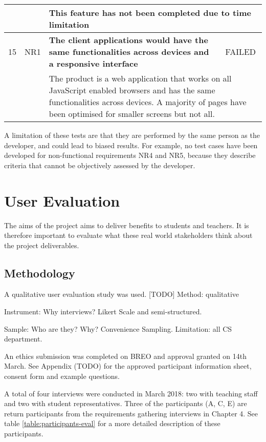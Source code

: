 \begin{table}[!ht]
\begin{tabularx}{\textwidth}{|c|c|X|c|}
        \hline
        &                         & \multicolumn{2}{X|}{This feature has not been completed due to time limitation}                                                                                                 \\
		\hline
		15 & NR1 & \textbf{The client applications would have the same functionalities
        across devices and a responsive interface} & \cellcolor{pink}FAILED \\
		\hline
           &      & \multicolumn{2}{X|}{The product is a web application that works on all 
           JavaScript enabled browsers and has the same functionalities across devices.
           A majority of pages have been optimised for smaller screens but not all.}      \\
        \hline
	\end{tabularx}
\end{table}

A limitation of these tests are that they are performed by the same person as the developer, 
and could lead to biased results. 
For example, no test cases have been developed for non-functional requirements NR4 and NR5, 
because they describe criteria that cannot be objectively assessed by the developer.

\section{User Evaluation}

The aims of the project aims to deliver benefits to students and teachers. 
It is therefore important to evaluate what these real world stakeholders think about the project deliverables.

\subsection{Methodology}

A qualitative user evaluation study was used.
[TODO]
Method: qualitative

Instrument: Why interviews? Likert Scale and semi-structured.

Sample: Who are they? Why? Convenience Sampling. Limitation: all CS department.

An ethics submission was completed on BREO and approval granted on 14th March.
See Appendix (TODO) for the approved participant information sheet, consent form and example questions.

A total of four interviews were conducted in March 2018:
two with teaching staff and two with student representatives.
Three of the participants (A, C, E) are return participants from the requirements gathering interviews in Chapter 4.
See table \ref{table:participants-eval} for a more detailed description of these participants.

